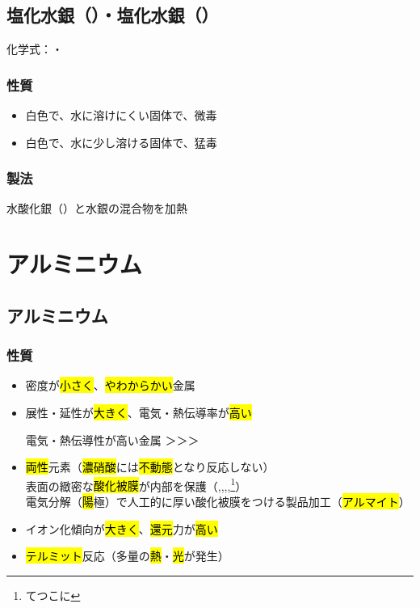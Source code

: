  \subsection{塩化水銀（）・塩化水銀（）}
 化学式：\hl{}・\hl{}
 \subsubsection{性質}
 \begin{itemize}
  \item 白色で、水に溶けにくい固体で、微毒 
  \item 白色で、水に少し溶ける固体で、猛毒 
 \end{itemize}
 \subsubsection{製法}
 水酸化銀（）と水銀の混合物を加熱\\
 \section{アルミニウム}
 \subsection{アルミニウム}
 \subsubsection{性質}
 \begin{itemize}
  \item 密度が\hl{小さく}、\hl{やわからかい}金属
  \item 展性・延性が\hl{大きく}、電気・熱伝導率が\hl{高い}
  \begin{itembox}[l]{電気・熱伝導性が高い金属}
  \hl{}＞\hl{}＞\hl{}＞\hl{}
  \end{itembox}
  \item \hl{両性}元素（\hl{濃硝酸}には\hl{不動態}となり反応しない）\\
  表面の緻密な\hl{酸化被膜}が内部を保護（\hl{},\hl{},\hl{},\hl{},\hl{}\footnote{てつこに}）\\
  電気分解（\hl{陽}極）で人工的に厚い酸化被膜をつける製品加工（\hl{アルマイト}）
  \item イオン化傾向が\hl{大きく}、\hl{還元}力が\hl{高い}
  \item \hl{テルミット}反応（多量の\hl{熱}・\hl{光}が発生）
 \end{itemize}
